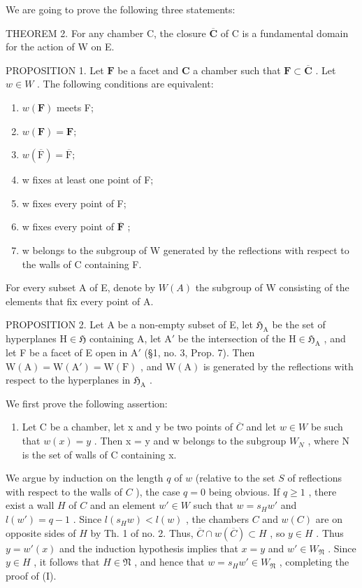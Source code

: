 We are going to prove the following three statements:

THEOREM 2. For any chamber C, the closure \(\overline{\mathbf{C}}\) of C is a fundamental domain for the action of W on E.

PROPOSITION 1. Let \(\mathbf{F}\) be a facet and \(\mathbf{C}\) a chamber such that \(\mathbf{F} \subset \overline{\mathbf{C}}\) . Let \(w \in W\) . The following conditions are equivalent:

\begin{enumerate}
\def\labelenumi{(\roman{enumi})}
\item
  \(w(\mathbf{F})\) meets F;
\item
  \(w(\mathbf{F}) = \mathbf{F};\)
\item
  \(w(\overline{\mathrm{F}}) = \overline{\mathrm{F}};\)
\item
  w fixes at least one point of F;
\item
  w fixes every point of F;
\item
  w fixes every point of \(\overline{\mathbf{F}}\) ;
\item
  w belongs to the subgroup of W generated by the reflections with respect to the walls of C containing F.
\end{enumerate}

For every subset A of E, denote by \(W(A)\) the subgroup of W consisting of the elements that fix every point of A.

PROPOSITION 2. Let A be a non-empty subset of E, let \(\mathfrak{H}_{\mathrm{A}}\) be the set of hyperplanes \(\mathrm{H} \in \mathfrak{H}\) containing A, let \(\mathrm{A}'\) be the intersection of the \(\mathrm{H} \in \mathfrak{H}_{\mathrm{A}}\) , and let F be a facet of E open in \(\mathrm{A}'\) (§1, no. 3, Prop. 7). Then \(\mathrm{W(A)} = \mathrm{W(A')} = \mathrm{W(F)}\) , and \(\mathrm{W(A)}\) is generated by the reflections with respect to the hyperplanes in \(\mathfrak{H}_{\mathrm{A}}\) .

We first prove the following assertion:

\begin{enumerate}
\def\labelenumi{(\Roman{enumi})}
\tightlist
\item
  Let C be a chamber, let x and y be two points of \(\overline{C}\) and let \(w \in W\) be such that \(w(x) = y\) . Then x = y and w belongs to the subgroup \(W_{N}\) , where N is the set of walls of C containing x.
\end{enumerate}

We argue by induction on the length \(q\) of \(w\) (relative to the set \(S\) of reflections with respect to the walls of \(C\) ), the case \(q = 0\) being obvious. If \(q \geqslant 1\) , there exist a wall \(H\) of \(C\) and an element \(w' \in W\) such that \(w = s_H w'\) and \(l(w') = q - 1\) . Since \(l(s_H w) < l(w)\) , the chambers \(C\) and \(w(C)\) are on opposite sides of \(H\) by Th. 1 of no. 2. Thus, \(\overline{C} \cap w(\overline{C}) \subset H\) , so \(y \in H\) . Thus \(y = w'(x)\) and the induction hypothesis implies that \(x = y\) and \(w' \in W_{\mathfrak{N}}\) . Since \(y \in H\) , it follows that \(H \in \mathfrak{N}\) , and hence that \(w = s_H w' \in W_{\mathfrak{N}}\) , completing the proof of (I).

